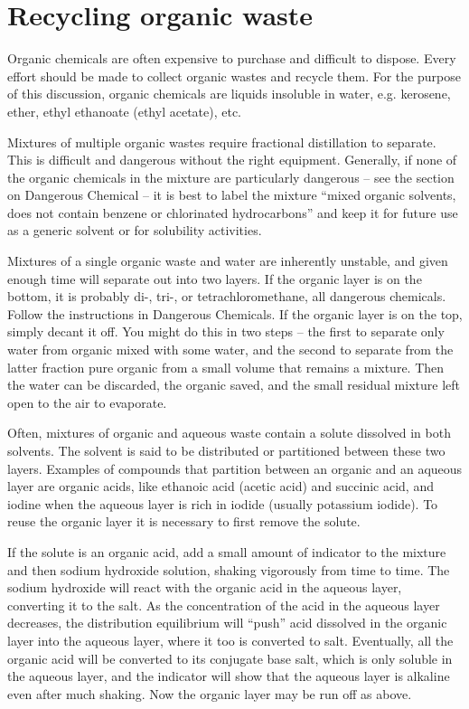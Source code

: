 \chapter{Recycling organic waste}

Organic chemicals are often expensive 
to purchase and difficult to dispose. 
Every effort should be made to collect organic wastes and recycle them. 
For the purpose of this discussion, 
organic chemicals are liquids insoluble in water, 
e.g. 
kerosene, 
ether, 
ethyl ethanoate (ethyl acetate), 
etc.

Mixtures of multiple organic wastes 
require fractional distillation to separate. 
This is difficult and dangerous without the right equipment. 
Generally, 
if none of the organic chemicals in the mixture are particularly dangerous – 
see the section on Dangerous Chemical – 
it is best to label the mixture “mixed organic solvents, 
does not contain benzene or chlorinated hydrocarbons” 
and keep it for future use as a generic solvent or for solubility activities.

Mixtures of a single organic waste and water are inherently unstable, 
and given enough time will separate out into two layers. 
If the organic layer is on the bottom, 
it is probably di-, 
tri-, 
or tetrachloromethane, 
all dangerous chemicals. 
Follow the instructions in Dangerous Chemicals. 
If the organic layer is on the top, 
simply decant it off. 
You might do this in two steps – 
the first to separate only water from organic mixed with some water, 
and the second to separate from the latter fraction pure organic 
from a small volume that remains a mixture. 
Then the water can be discarded, 
the organic saved, 
and the small residual mixture left open to the air to evaporate.

Often, 
mixtures of organic and aqueous waste 
contain a solute dissolved in both solvents. 
The solvent is said to be distributed 
or partitioned between these two layers. 
Examples of compounds that partition between an organic 
and an aqueous layer are organic acids, 
like ethanoic acid (acetic acid) and succinic acid, 
and iodine when the aqueous layer is rich in iodide 
(usually potassium iodide). 
To reuse the organic layer it is necessary to first remove the solute.

If the solute is an organic acid, 
add a small amount of indicator to the mixture 
and then sodium hydroxide solution, 
shaking vigorously from time to time. 
The sodium hydroxide will react with the organic acid 
in the aqueous layer, 
converting it to the salt. 
As the concentration of the acid in the aqueous layer decreases, 
the distribution equilibrium will “push” acid dissolved 
in the organic layer into the aqueous layer, 
where it too is converted to salt. 
Eventually, 
all the organic acid will be converted to its conjugate base salt, 
which is only soluble in the aqueous layer, 
and the indicator will show that the aqueous layer 
is alkaline even after much shaking. 
Now the organic layer may be run off as above.


